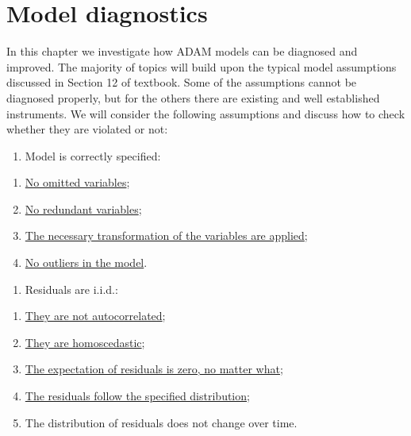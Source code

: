 \documentclass[
]{book}
\providecommand{\tightlist}{%
  \setlength{\itemsep}{0pt}\setlength{\parskip}{0pt}}
\theoremstyle{definition}
\theoremstyle{definition}
\theoremstyle{definition}
\theoremstyle{definition}
\theoremstyle{remark}
\begin{document}
\hypertarget{diagnostics}{%
\chapter{Model diagnostics}\label{diagnostics}}

In this chapter we investigate how ADAM models can be diagnosed and improved. The majority of topics will build upon the typical model assumptions discussed in Section 12 of \citet{SvetunkovSBA} textbook. Some of the assumptions cannot be diagnosed properly, but for the others there are existing and well established instruments. We will consider the following assumptions and discuss how to check whether they are violated or not:

\begin{enumerate}
\def\labelenumi{\arabic{enumi}.}
\tightlist
\item
  Model is correctly specified:
\end{enumerate}

\begin{enumerate}
\def\labelenumi{\alph{enumi}.}
\tightlist
\item
  \protect\hyperlink{diagnosticsOmitted}{No omitted variables};
\item
  \protect\hyperlink{diagnosticsRedundant}{No redundant variables};
\item
  \protect\hyperlink{diagnosticsTransformations}{The necessary transformation of the variables are applied};
\item
  \protect\hyperlink{diagnosticsOutliers}{No outliers in the model}.
\end{enumerate}

\begin{enumerate}
\def\labelenumi{\arabic{enumi}.}
\setcounter{enumi}{1}
\tightlist
\item
  Residuals are i.i.d.:
\end{enumerate}

\begin{enumerate}
\def\labelenumi{\alph{enumi}.}
\tightlist
\item
  \protect\hyperlink{diagnosticsResidualsIIDAuto}{They are not autocorrelated};
\item
  \protect\hyperlink{diagnosticsResidualsIIDHetero}{They are homoscedastic};
\item
  \protect\hyperlink{diagnosticsResidualsIIDExpectation}{The expectation of residuals is zero, no matter what};
\item
  \protect\hyperlink{diagnosticsResidualsIIDDistribution}{The residuals follow the specified distribution};
\item
  The distribution of residuals does not change over time.
\end{enumerate}
\end{document}
